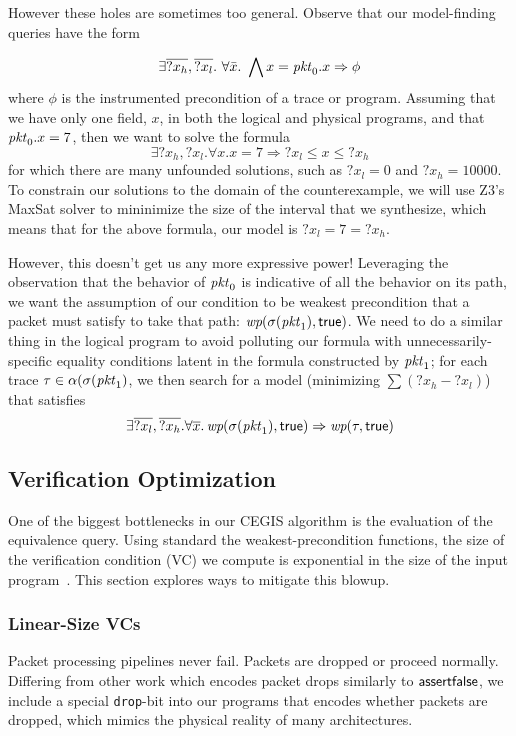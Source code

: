However these holes are sometimes too general. Observe that our
model-finding queries have the form

\[\exists \overline{?x_h},\overline{?x_l}.~\forall \bar x.~\bigwedge x = \mathit{pkt}_0.x \Rightarrow \phi\]
where $\phi$ is the instrumented precondition of a trace or
program. Assuming that we have only one field, $x$, in both the
logical and physical programs, and that $\mathit{pkt}_0.x = 7$, then
we want to solve the formula
\[\exists ?x_h,?x_l. \forall x. x = 7 \Rightarrow ?x_l \leq x \leq ?x_h\]
for which there are many unfounded solutions, such as $?x_l = 0$ and
$?x_h = 10000$. To constrain our solutions to the domain of the
counterexample, we will use Z3's MaxSat solver to mininimize the size
of the interval that we synthesize, which means that for the above
formula, our model is $?x_l = 7 = ?x_h$.

However, this doesn't get us any more expressive power! Leveraging the
observation that the behavior of $\mathit{pkt}_0$ is indicative of all the
behavior on its path, we want the assumption of our condition to be
weakest precondition that a packet must satisfy to take that path:
$\mathop{\textit{wp}}(\sigma(\mathit{pkt}_1), \mathsf{true})$. We need to do a similar thing in the
logical program to avoid polluting our formula with
unnecessarily-specific equality conditions latent in the formula
constructed by $\mathit{pkt}_1$; for each trace
$\tau \in \alpha(\sigma(\mathit{pkt}_1)$, we then search for a model
(minimizing $\sum (?x_h - ?x_l)$) that satisfies
\[\exists \overline{?x_l},\overline{?x_h}. \forall \overline
  x. \mathop{\textit{wp}}(\sigma(\mathit{pkt}_1),\mathsf{true}) \Rightarrow \mathop{\textit{wp}}(\tau, \mathsf{true})\]

\subsection{Verification Optimization}
One of the biggest bottlenecks in our CEGIS algorithm is the
evaluation of the equivalence query. Using standard the
weakest-precondition functions, the size of the verification condition
(VC) we compute is exponential in the size of the input
program~\cite{dijkstra}. This section explores ways to mitigate this blowup.

\subsubsection{Linear-Size VCs}
Packet processing pipelines never fail. Packets are dropped or proceed
normally. Differing from other work which encodes packet
drops similarly to $\mathsf{assert} \mathsf{false}$, we include a special
\texttt{drop}-bit into our programs that encodes whether packets are
dropped, which mimics the physical reality of many
architectures.

